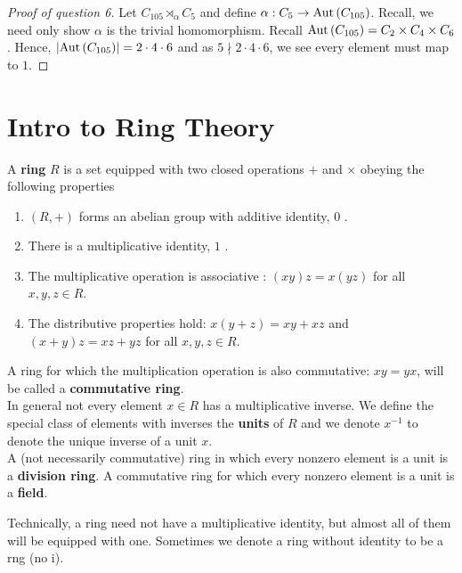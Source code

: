 \begin{proof}[Proof of question 6]
	Let \(C_{105} \rtimes_{\alpha} C_5\) 	and define \(\alpha: C_5 \to \operatorname{Aut}\left( C_{105} \right) \). Recall, we need only show \(\alpha\) is the trivial homomorphism. Recall \( \operatorname{Aut}\left( C_{105} \right) = C_2 \times C_4 \times C_6  \). Hence, \(\left| \operatorname{Aut}\left( C_{105} \right)  \right| = 2 \cdot 4 \cdot 6 \) and as \(5 \nmid 2 \cdot 4 \cdot 6\), we see every element must map to \(1\).
\end{proof}
\section{Intro to Ring Theory}
\begin{definition}[Ring]
A \textbf{ring} \(R\) is a set equipped with two closed operations \(+\) and \(\times\) obeying the following properties
\begin{enumerate}
	\item \((R, +)\) forms an abelian group with additive identity, \(0\) .
	\item There is a multiplicative identity, \(1\) .
	\item The multiplicative operation is associative : \(\left( xy \right) z = x\left(yz  \right) \) for all \(x, y, z \in R\).
	\item The distributive properties hold: \(x\left( y+z \right) = xy + xz\) and \(\left( x + y \right) z = xz + yz\) for all \(x, y, z \in R\).
\end{enumerate}
A ring for which the multiplication operation is also commutative: \(xy = yx\), will be called a \textbf{commutative ring}.\\
	In general not every element \(x \in R\) has a multiplicative inverse. We define the special class of elements with inverses the \textbf{units} of \(R\) and we denote \(x^{-1}\) to denote the unique inverse of a unit \(x\).\\
	A (not necessarily commutative) ring in which every nonzero element is a unit is a \textbf{division ring}.
	A commutative ring for which every nonzero element is a unit is a \textbf{field}.
\end{definition}
\begin{remark}
	Technically, a ring need not have a multiplicative identity, but almost all of them will be equipped with one. Sometimes we denote a ring without identity to be a rng (no i).
\end{remark}
\begin{example}

\end{example}
